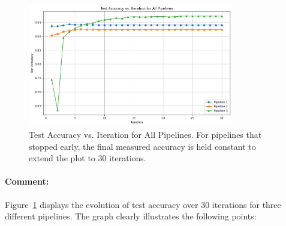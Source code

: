 \documentclass[12pt]{article}
\begin{document}
\begin{figure}[ht]
\centering
\includegraphics[width=0.8\textwidth]{accs_part3.png}
\caption{Test Accuracy vs. Iteration for All Pipelines. For pipelines that stopped early, the final measured accuracy is held constant to extend the plot to 30 iterations.}
\label{fig:accuracy_vs_iteration}
\end{figure}

\paragraph{Comment:}
Figure~\ref{fig:accuracy_vs_iteration} displays the evolution of test accuracy over 30 iterations for three different pipelines. The graph clearly illustrates the following points:
\end{document}
